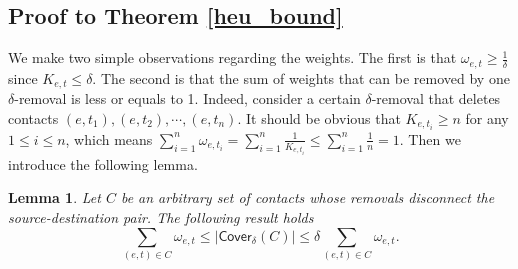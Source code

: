 \documentclass[10pt, conference, letterpaper]{IEEEtran}
\newtheorem{lemma}{Lemma}
\begin{document}
\subsection{Proof to Theorem \ref{heu_bound}}\label{proof_heu_bound}
We  make two simple observations regarding the weights. The first is that $\omega_{e,t}\ge \frac{1}{\delta}$ since $K_{e,t}\le \delta$. The second is that the sum of weights that can be removed by one $\delta$-removal is less or equals to 1. Indeed, consider a certain $\delta$-removal that deletes contacts $(e,t_1),(e,t_2),\cdots,(e,t_n)$. It should be obvious that $K_{e,t_i}\ge n$ for any $1\le i\le n$, which means $\sum_{i=1}^n\omega_{e,t_i}=\sum_{i=1}^n \frac{1}{K_{e,t_i}}\le \sum_{i=1}^n \frac{1}{n}=1$. Then we introduce the following lemma.
\begin{lemma}\label{heu_lemma}
 Let $C$ be an arbitrary set of contacts whose removals disconnect the source-destination pair. The following result holds
\[
\sum_{(e,t)\in C}\omega_{e,t}\le |\mathsf{Cover_{\delta}}(C)|\le \delta\sum_{(e,t)\in C}\omega_{e,t}.
\]
\end{lemma}
\end{document}
